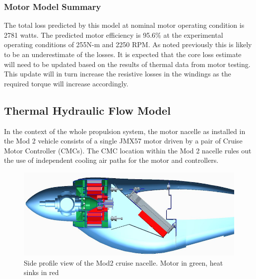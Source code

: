 \documentclass[]{aiaa-tc}%
\begin{document}
\subsubsection{Motor Model Summary}
The total loss predicted by this model at nominal motor operating condition is 2781 watts. The predicted motor efficiency is 95.6\% at the experimental operating conditions of 255N-m and 2250 RPM. As noted previously this is likely to be an underestimate of the losses. It is expected that the core loss estimate will need to be updated based on the results of thermal data from motor testing. This update will in turn increase the resistive losses in the windings as the required torque will increase accordingly.

\subsection{Thermal Hydraulic Flow Model}

In the context of the whole propulsion system, the motor nacelle as installed in the Mod 2 vehicle consists of a single JMX57 motor driven by a pair of Cruise Motor Controller (CMCs).  The CMC location within the Mod 2 nacelle rules out the use of independent cooling air paths for the motor and controllers.  

\begin{figure}[!h]%
	\centering
	\includegraphics[width=1.0\textwidth]{figures/mod2_profile.png}
	\caption{Side profile view of the Mod2 cruise nacelle. Motor in green, heat sinks in red}
	\label{fig:Mod2Profile}
\end{figure}
\end{document}
